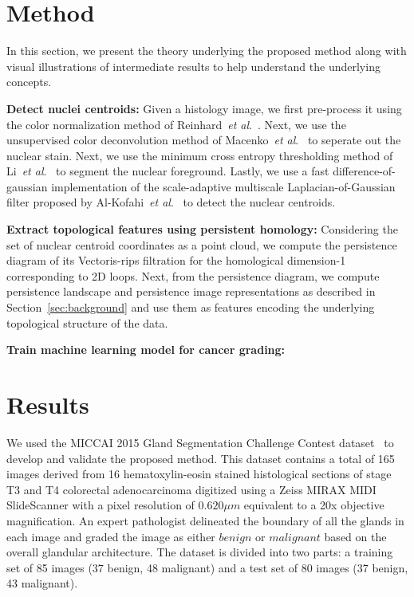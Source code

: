 \documentclass{article}
\newcommand{\etal}{~\textit{et al}.}
\begin{document}
\section{Method}
\label{sec:method}
In this section, we present the theory underlying the proposed method along with visual illustrations of intermediate results to help understand the underlying concepts. 

\smallskip
\noindent \textbf{Detect nuclei centroids:} Given a histology image, we first pre-process it using the color normalization method of Reinhard\etal~\cite{Reinhard2001}. Next, we use the unsupervised color deconvolution method of Macenko\etal~\cite{Macenko2009} to seperate out the nuclear stain. Next, we use the minimum cross entropy thresholding method of Li\etal~\cite{Li1998} to segment the nuclear foreground. Lastly, we use a fast difference-of-gaussian implementation of the scale-adaptive multiscale Laplacian-of-Gaussian filter proposed by Al-Kofahi\etal~\cite{Al-Kofahi2010} to detect the nuclear centroids. 

\smallskip
\noindent \textbf{Extract topological features using persistent homology:} Considering the set of nuclear centroid coordinates as a point cloud, we compute the persistence diagram of its Vectoris-rips filtration for the homological dimension-1 corresponding to 2D loops. Next, from the persistence diagram, we compute persistence landscape and persistence image representations as described in Section~\ref{sec:background} and use them as features encoding the underlying topological structure of the data. 

\smallskip
\noindent \textbf{Train machine learning model for cancer grading:}

\section{Results}
\label{sec:results}
We used the MICCAI 2015 Gland Segmentation Challenge Contest dataset~\cite{Sirinukunwattana2017} to develop and validate the proposed method. This dataset contains a total of 165 images derived from 16 hematoxylin-eosin stained histological sections of stage T3 and T4 colorectal adenocarcinoma digitized using a Zeiss MIRAX MIDI SlideScanner with a pixel resolution of $0.620 \mu m$ equivalent to a 20x objective magnification. An expert pathologist delineated the boundary of all the glands in each image and graded the image as either $benign$ or $malignant$ based on the overall glandular architecture. The dataset is divided into two parts: a training set of 85 images (37 benign, 48 malignant) and a test set of 80 images (37 benign, 43 malignant).
\end{document}
